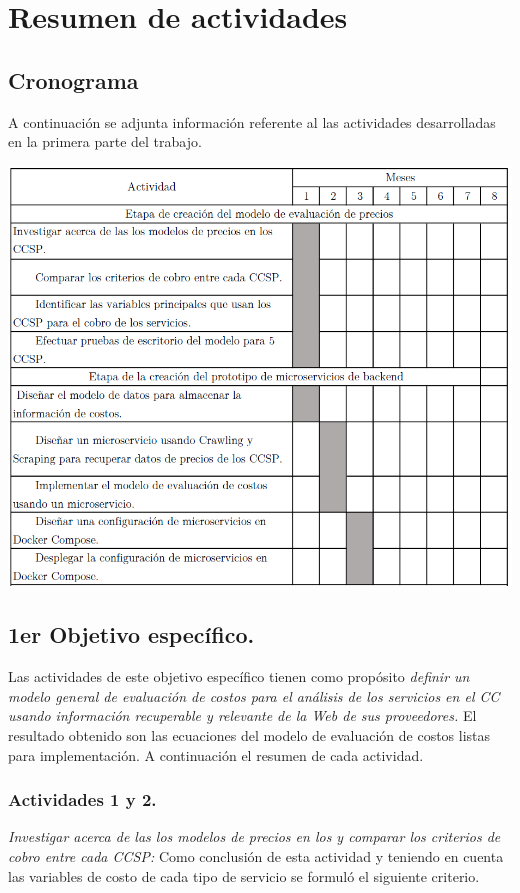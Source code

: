 
\chapter{Resumen de actividades} %

\label{ch:metodologia} %
\section{Cronograma}
A continuación se adjunta información referente al las actividades desarrolladas en la primera parte del trabajo.
\begin{center}
    \includegraphics[width=\textwidth]{gfx/actividades.png}
\end{center}

\section{1er Objetivo específico.}
Las actividades de este objetivo específico tienen como propósito \emph{definir un modelo general de evaluación de costos para el análisis de los servicios en el \acrshort{CC} usando información recuperable y relevante de la Web de sus proveedores.} El resultado obtenido son las ecuaciones del modelo de evaluación de costos listas para implementación. A continuación el resumen de cada actividad.

\subsection{Actividades 1 y 2.}
\emph{Investigar acerca de las los modelos de precios en los  y comparar los criterios de cobro entre cada \acrshort{CCSP}:} \newline\newline
Como conclusión de esta actividad y teniendo en cuenta las variables de costo de cada tipo de servicio se formuló el siguiente criterio.

